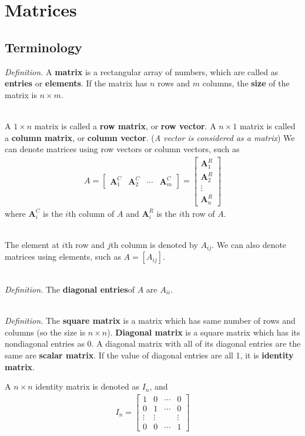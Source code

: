 \chapter{Matrices}
\section{Terminology}

\textit{Definition.} A \textbf{matrix} is a rectangular array of numbers, which are called as \textbf{entries} or \textbf{elements}. If the matrix has $n$ rows and $m$ columns, the \textbf{size} of the matrix is $n \times m$.

\noindent \\ A $1 \times n$ matrix is called a \textbf{row matrix}, or \textbf{row vector}. A $n \times 1$ matrix is called a \textbf{column matrix}, or \textbf{column vector}. (\textit{A vector is considered as a matrix}) We can denote matrices using row vectors or column vectors, such as 
\begin{align*}
A = \begin{bmatrix}
\textbf{A}^{C}_1 & \textbf{A}^{C}_2 & \cdots & \textbf{A}^{C}_m
\end{bmatrix} = \begin{bmatrix}
\textbf{A}^{R}_1 \\ \textbf{A}^{R}_2 \\ \vdots \\ \textbf{A}^{R}_n
\end{bmatrix}
\end{align*} where $\textbf{A}^{C}_i$ is the $i$th column of $A$ and $\textbf{A}^{R}_i$ is the $i$th row of $A$.

\noindent \\ The element at $i$th row and $j$th column is denoted by $A_{ij}$. We can also denote matrices using elements, such as $A = [A_{ij}]$.

\noindent \\ \textit{Definition.} The \textbf{diagonal entries}of $A$ are $A_{ii}$.

\noindent \\ \textit{Definition.} The \textbf{square matrix} is a matrix which has same number of rows and columns (so the size is $n \times n$). \textbf{Diagonal matrix} is a square matrix which has its nondiagonal entries as 0. A diagonal matrix with all of its diagonal entries are the same are \textbf{scalar matrix}. If the value of diagonal entries are all 1, it is \textbf{identity matrix}.

\noindent A $n \times n$ identity matrix is denoted as $I_n$, and
\begin{align*}
I_n = \begin{bmatrix}
1 & 0 & \cdots & 0 \\
0 & 1 & \cdots & 0 \\
\vdots & \vdots & & \vdots \\
0 & 0 & \cdots & 1
\end{bmatrix}
\end{align*}

